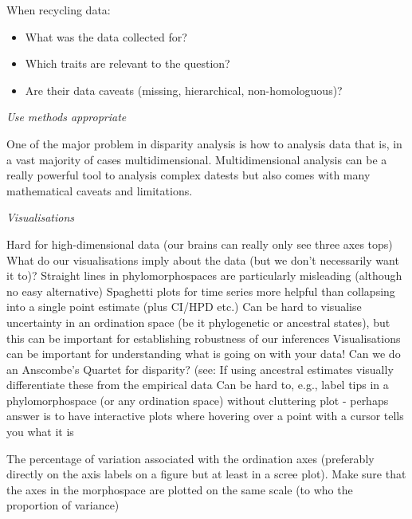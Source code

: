 \documentclass[12pt,letterpaper]{article}
\renewcommand{\subsection}[1]{%
\bigskip
\begin{center}
\begin{large}
\normalfont\itshape #1
\end{large}
\end{center}}
\begin{document}
When recycling data:
\begin{itemize}
    \item What was the data collected for?
    \item Which traits are relevant to the question?
    \item Are their data caveats (missing, hierarchical, non-homologuous)?
\end{itemize}


\subsection{Use methods appropriate} 
One of the major problem in disparity analysis is how to analysis data that is, in a vast majority of cases multidimensional.
Multidimensional analysis can be a really powerful tool to analysis complex datests but also comes with many mathematical caveats and limitations.



\subsection{Visualisations}
\label{visualisation}
Hard for high-dimensional data (our brains can really only see three axes tops)
What do our visualisations imply about the data (but we don’t necessarily want it to)?
Straight lines in phylomorphospaces are particularly misleading (although no easy alternative)
Spaghetti plots for time series more helpful than collapsing into a single point estimate (plus CI/HPD etc.)
Can be hard to visualise uncertainty in an ordination space (be it phylogenetic or ancestral states), but this can be important for establishing robustness of our inferences
Visualisations can be important for understanding what is going on with your data!
Can we do an Anscombe’s Quartet for disparity? (see: %
If using ancestral estimates visually differentiate these from the empirical data
Can be hard to, e.g., label tips in a phylomorphospace (or any ordination space) without cluttering plot - perhaps answer is to have interactive plots where hovering over a point with a cursor tells you what it is

The percentage of variation associated with the ordination axes (preferably directly on the axis labels on a figure but at least in a scree plot).
Make sure that the axes in the morphospace are plotted on the same scale (to who the proportion of variance)
\end{document}
